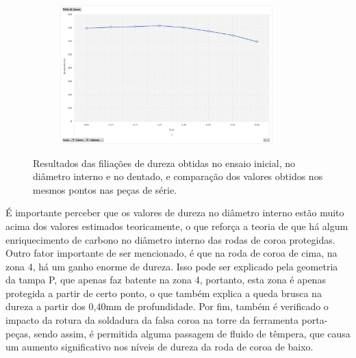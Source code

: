 \begin{figure}[htb]
\begin{subfigure}{.4\textwidth}
        \caption[]%
        {}
        \label{fig:resultados_Tampa_P_inicial_dent}
    \end{subfigure}%
    \begin{subfigure}{.4\textwidth}
        \centering
        \includegraphics[width = 0.9\textwidth]{Figures/Cap4/Grafico_4_Zonas_S_inicial_dentado.png}
        \caption{}
        \label{fig:resultados_Serie_inicial_dent}
    \end{subfigure}
    \caption[Resultados do ensaio inicial e comparação com peças de série]%
    {Resultados das filiações de dureza obtidas no ensaio inicial, no diâmetro interno e no dentado, e comparação dos valores obtidos nos mesmos pontos nas peças de série.}
\end{figure}
\newpage
\par
É importante perceber que os valores de dureza no diâmetro interno estão muito acima dos valores estimados teoricamente, o que reforça a teoria de que há algum enriquecimento de carbono no diâmetro interno das rodas de coroa protegidas. Outro fator importante de ser mencionado, é que na roda de coroa de cima, na zona 4, há um ganho enorme de dureza. Isso pode ser explicado pela geometria da tampa P, que apenas faz batente na zona 4, portanto, esta zona é apenas protegida a partir de certo ponto, o que também explica a queda brusca na dureza a partir dos 0,40mm de profundidade. Por fim, também é verificado o impacto da rotura da soldadura da falsa coroa na torre da ferramenta porta-peças, sendo assim, é permitida alguma passagem de fluido de têmpera, que causa um aumento significativo nos níveis de dureza da roda de coroa de baixo.
